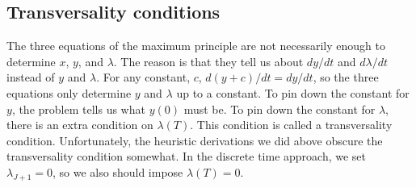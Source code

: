 \subsection{Transversality conditions}

The three equations of the maximum principle are not necessarily
enough to determine $x$, $y$, and $\lambda$. The reason is that they
tell us about $dy/dt$ and $d\lambda/dt$ instead of $y$ and
$\lambda$. For any constant, $c$, $d(y+c)/dt = dy/dt$, so the three
equations only determine $y$ and $\lambda$ up to a constant. To pin
down the constant for $y$, the problem tells us what $y(0)$ must
be. To pin down the constant for $\lambda$, there is an extra
condition on $\lambda(T)$. This condition is called a transversality
condition. Unfortunately, the heuristic derivations we did above
obscure the transversality condition somewhat. In the discrete time
approach, we set $\lambda_{J+1} =0$, so we also should impose
$\lambda(T) = 0$. 

